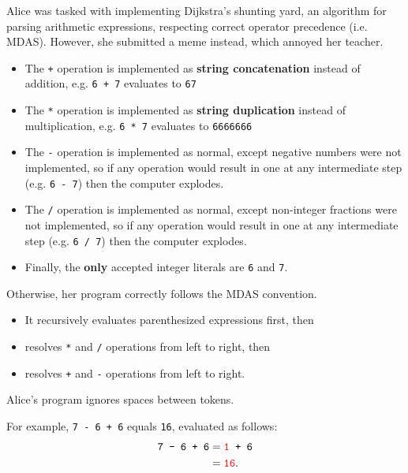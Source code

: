 

Alice was tasked with implementing Dijkstra's shunting yard, an algorithm for parsing arithmetic expressions, respecting correct operator precedence (i.e. MDAS).  However, she submitted a meme instead, which annoyed her teacher.
\begin{itemize}
    \item The \texttt{+} operation is implemented as \textbf{string concatenation} instead of addition, \newline e.g. \texttt{6 + 7} evaluates to \texttt{67}
    \item The \texttt{*} operation is implemented as \textbf{string duplication} instead of multiplication, \newline e.g. \texttt{6 * 7} evaluates to \texttt{6666666}
    \item The \texttt{-} operation is implemented as normal, except negative numbers were not implemented, so if any operation would result in one at any intermediate step \newline (e.g. \texttt{6 - 7}) then the computer explodes.
    \item The \texttt{/} operation is implemented as normal, except non-integer fractions were not implemented, so if any operation would result in one at any intermediate step \newline (e.g. \texttt{6 / 7}) then the computer explodes.
    \item Finally, the \textbf{only} accepted integer literals are \texttt{6} and \texttt{7}.
\end{itemize}
Otherwise, her program correctly follows the MDAS convention.
\begin{itemize}
    \item It recursively evaluates parenthesized expressions first, then
    \item resolves \texttt{*} and \texttt{/} operations from left to right, then
    \item resolves \texttt{+} and \texttt{-} operations from left to right.
\end{itemize}
Alice's program ignores spaces between tokens.

For example, \texttt{7 - 6 + 6} equals \texttt{16}, evaluated as follows:
\begin{align*}
    \texttt{7 - 6 + 6}
    &= \texttt{{\color{red}1} + 6} \\
    &= \texttt{{\color{red}16}}.
\end{align*}

